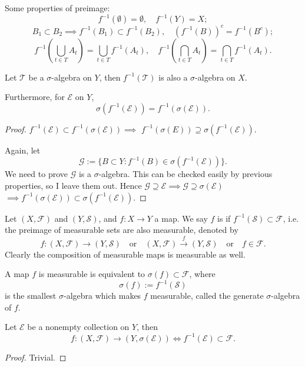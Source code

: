 Some properties of preimage:
	\[
	f^{-1}(\emptyset) = \emptyset,\quad f^{-1}(Y) = X;
	\]
	\[
	B_1 \subset B_2\implies f^{-1}(B_1)\subset f^{-1}(B_2),
	\quad (f^{-1}(B))^c = f^{-1}(B^c);
	\]
	\[
	f^{-1}\left(\bigcup_{t\in T}A_t\right) = \bigcup_{t\in T}f^{-1}(A_t),\quad
	f^{-1}\left(\bigcap_{t\in T}A_t\right) = \bigcap_{t\in T}f^{-1}(A_t).
	\]
\begin{proposition}
	Let $ \mathscr{T}$ be a $\sigma$-algebra on $Y$, then $ f^{-1}(\mathscr{T})$
	is also a $\sigma$-algebra on $X$.

	Furthermore, for $ \mathscr{E}$ on  $Y$,
	\[
	\sigma(f^{-1}(\mathscr{E})) = f^{-1}(\sigma(\mathscr{E})).
	\]
\end{proposition}
\begin{proof}[Proof]
    $f^{-1}(\mathscr{E}) \subset f^{-1}(\sigma(\mathscr{E}))\implies$
	$f^{-1}(\sigma(E))\supseteq \sigma(f^{-1}(\mathscr{E}))$.

	Again, let
	\[
	\mathscr{G}:=\{B \subset Y: f^{-1} (B) \in \sigma(f^{-1}(\mathscr{E}))\}.
	\]
	We need to prove $\mathscr{G}$ is a $\sigma$-algebra.
	This can be checked easily by previous properties, so I leave them out.
	Hence $\mathscr{G} \supseteq \mathscr{E}\implies
	\mathscr{G} \supseteq \sigma(\mathscr{E})$
	$\implies f^{-1}(\sigma(\mathscr{E})) \subset \sigma(f^{-1}(\mathscr{E}))$.
\end{proof}

\begin{definition}
	Let $(X, \mathscr{F})$ and $(Y, \mathscr{S})$, and $f:X\to Y$ a map.
	We say  $f$ is  if $f^{-1}(\mathscr{S}) \subset \mathscr{F}$,
	i.e. the preimage of measurable sets are also measurable,
	denoted by
	\[
	f:(X,\mathscr{F})\to(Y,\mathscr{S}) \quad\text{or}\quad
	(X,\mathscr{F})\xrightarrow{f}(Y, \mathscr{S}) \quad\text{or}\quad f\in \mathscr{F}.
	\]
Clearly the composition of measurable maps is measurable as well.
\end{definition}

A map $f$ is measurable is equivalent to  $\sigma(f)\subset \mathscr{F}$, where
\[
\sigma(f):= f^{-1}(\mathscr{S})
\]
is the smallest $\sigma$-algebra which makes $f$ measurable,
called the generate $\sigma$-algebra of $f$.
\begin{theorem}
    Let $ \mathscr{E}$ be a nonempty collection on $Y$, then
	\[
		f:(X,\mathscr{F})\to (Y, \sigma(\mathscr{E})) \iff
		f^{-1}(\mathscr{E})\subset \mathscr{F}.
	\]
\end{theorem}
\begin{proof}[Proof]
    Trivial.
\end{proof}
